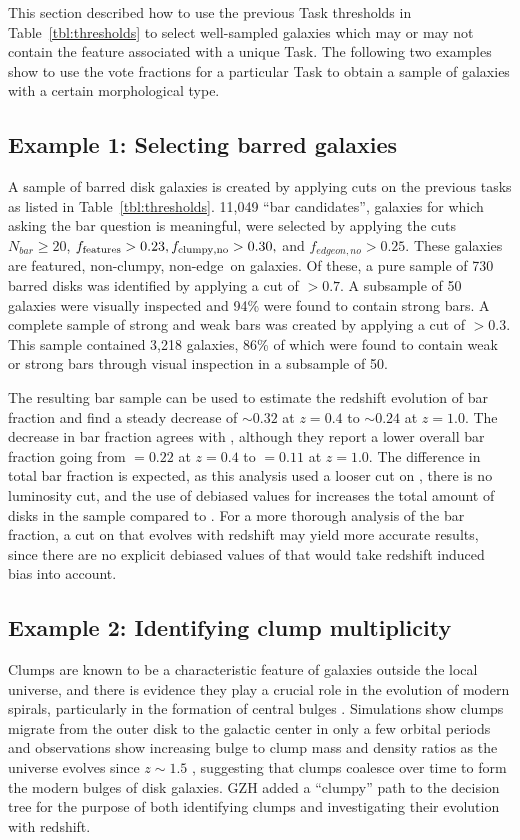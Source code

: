 \documentclass[twocolumn]{aastex6}
\begin{document}
This section described how to use the previous Task thresholds in Table~\ref{tbl:thresholds} to select well-sampled galaxies which may or may not contain the feature associated with a unique Task. The following two examples show to use the vote fractions for a particular Task to obtain a sample of galaxies with a certain morphological type.

\subsection{Example 1: Selecting barred galaxies} 

A sample of barred disk galaxies is created by applying cuts on the previous tasks as listed in Table~\ref{tbl:thresholds}. 11,049 ``bar candidates'', galaxies for which asking the bar question is meaningful, were selected by applying the cuts $N_{bar} \ge 20$, $f_{\rm features}>0.23, f_{\rm clumpy,no} > 0.30,$ and $f_{edgeon,no}>0.25$. These galaxies are featured, non-clumpy, non-edge~on galaxies. Of these, a pure sample of 730 barred disks was identified by applying a cut of \fbar$>0.7$. A subsample of 50 galaxies were visually inspected and 94\% were found to contain strong bars. A complete sample of strong and weak bars was created by applying a cut of \fbar$>0.3$. This sample contained 3,218 galaxies, 86\% of which were found to contain weak or strong bars through visual inspection in a subsample of 50.

The resulting bar sample can be used to estimate the redshift evolution of bar fraction and find a steady decrease of \fbar$\sim 0.32$ at $z=0.4$ to \fbar$\sim 0.24$ at $z=1.0$. The decrease in bar fraction agrees with \citet{mel14}, although they report a lower overall bar fraction going from \fbar$=0.22$ at $z=0.4$ to \fbar$=0.11$ at $z=1.0$. The difference in total bar fraction is expected, as this analysis used a looser cut on \fbar, there is no luminosity cut, and the use of debiased values for \ffeatures{} increases the total amount of disks in the sample compared to \citet{mel14}. For a more thorough analysis of the bar fraction, a cut on \fbar{} that evolves with redshift may yield more accurate results, since there are no explicit debiased values of \fbar{} that would take redshift induced bias into account. 

\subsection{Example 2: Identifying clump multiplicity}
Clumps are known to be a characteristic feature of galaxies outside the local universe, and there is evidence they play a crucial role in the evolution of modern spirals, particularly in the formation of central bulges \citep{elm05,elm14,guo15,beh16}. Simulations show clumps migrate from the outer disk to the galactic center in only a few orbital periods \citep{man15} and observations show increasing bulge to clump mass and density ratios as the universe evolves since $z\sim 1.5$ \citep{elm09}, suggesting that clumps coalesce over time to form the modern bulges of disk galaxies. GZH added a ``clumpy'' path to the decision tree for the purpose of both identifying clumps and investigating their evolution with redshift. 
\end{document}

